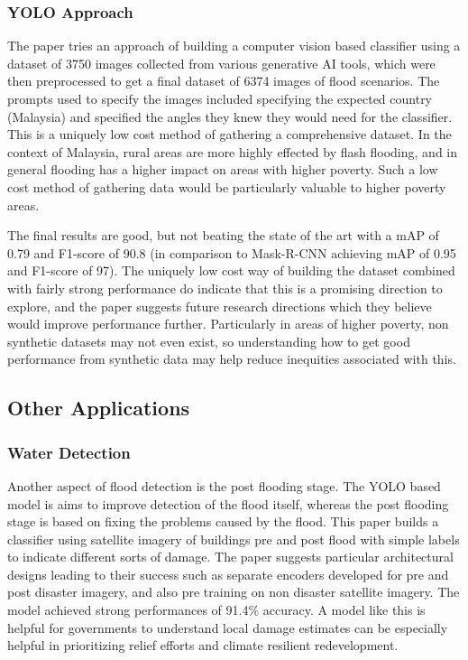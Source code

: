\documentclass[conference,a4paper]{IEEEtran}
\begin{document}
\subsubsection{YOLO Approach}

The paper tries an approach of building a computer vision based classifier using a dataset of 3750 images collected from various generative AI tools, which were then preprocessed to get a final dataset of 6374 images of flood scenarios. The prompts used to specify the images included specifying the expected country (Malaysia) and specified the angles they knew they would need for the classifier. This is a uniquely low cost method of gathering a comprehensive dataset. In the context of Malaysia, rural areas are more highly effected by flash flooding, and in general flooding has a higher impact on areas with higher poverty. Such a low cost method of gathering data would be particularly valuable to higher poverty areas.

The final results are good, but not beating the state of the art with a mAP of 0.79 and F1-score of 90.8 (in comparison to Mask-R-CNN achieving mAP of 0.95 and F1-score of 97). The uniquely low cost way of building the dataset combined with fairly strong performance do indicate that this is a promising direction to explore, and the paper suggests future research directions which they believe would improve performance further. Particularly in areas of higher poverty, non synthetic datasets may not even exist, so understanding how to get good performance from synthetic data may help reduce inequities associated with this.


\subsection{Other Applications}

\subsubsection{Water Detection}

Another aspect of flood detection is the post flooding stage. The YOLO based model is aims to improve detection of the flood itself, whereas the post flooding stage is based on fixing the problems caused by the flood. This paper builds a classifier using satellite imagery of buildings pre and post flood with simple labels to indicate different sorts of damage.  The paper suggests particular architectural designs leading to their success such as separate encoders developed for pre and post disaster imagery, and also pre training on non disaster satellite imagery. The model achieved strong performances of 91.4\% accuracy.  A model like this is helpful for governments to understand local damage estimates can be especially helpful in prioritizing relief efforts and climate resilient redevelopment.
\end{document}
